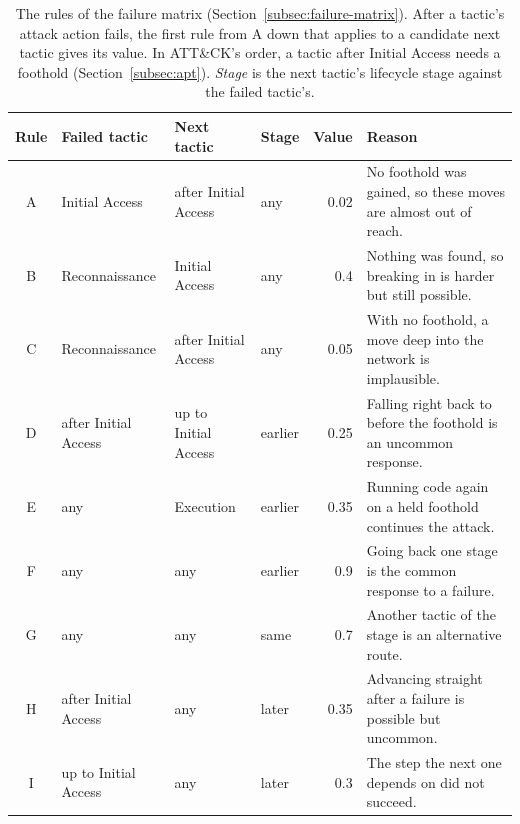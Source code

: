 
\begin{table}[htbp]
\centering
\caption[The rules of the failure matrix]{The rules of the failure matrix (Section~\ref{subsec:failure-matrix}). After a tactic's attack action fails, the first rule from A down that applies to a candidate next tactic gives its value. In ATT\&CK's order, a tactic after Initial Access needs a foothold (Section~\ref{subsec:apt}). \emph{Stage} is the next tactic's lifecycle stage against the failed tactic's.}
\label{tab:overlay-failure-rules}
\tablestyle
\setlength{\tabcolsep}{4pt}
\begin{tabular}{@{}c P{3.15cm} P{3.15cm} l r P{5.6cm}@{}}
\toprule
Rule & Failed tactic & Next tactic & Stage & Value & Reason \\
\midrule
A & Initial Access & after Initial Access & any & 0.02 & No foothold was gained, so these moves are almost out of reach. \\
B & Reconnaissance & Initial Access & any & 0.4 & Nothing was found, so breaking in is harder but still possible. \\
C & Reconnaissance & after Initial Access & any & 0.05 & With no foothold, a move deep into the network is implausible. \\
D & after Initial Access & up to Initial Access & earlier & 0.25 & Falling right back to before the foothold is an uncommon response. \\
E & any & Execution & earlier & 0.35 & Running code again on a held foothold continues the attack. \\
F & any & any & earlier & 0.9 & Going back one stage is the common response to a failure. \\
G & any & any & same & 0.7 & Another tactic of the stage is an alternative route. \\
H & after Initial Access & any & later & 0.35 & Advancing straight after a failure is possible but uncommon. \\
I & up to Initial Access & any & later & 0.3 & The step the next one depends on did not succeed. \\
\bottomrule
\end{tabular}
\end{table}

